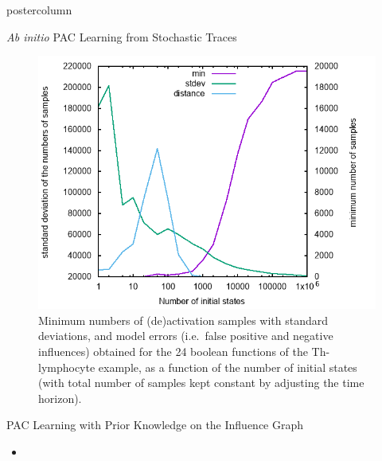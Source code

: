 \documentclass[final,hyperref={pdfpagelabels=false},xcolor=dvipsnames]{beamer}
\begin{document}
\begin{frame}
\begin{columns}
\begin{column}{.49\textwidth}
\begin{beamercolorbox}[center,wd=\textwidth]{postercolumn}
\begin{minipage}[T]{.95\textwidth}
{\begin{block}{\emph{Ab initio} PAC Learning from Stochastic Traces}
\begin{figure}[htb]
   \includegraphics[width=\textwidth]{statistics/statistics.png}
   \caption{Minimum numbers of (de)activation samples with standard deviations, and model errors (i.e.~false positive and negative influences) obtained for the 24 boolean functions of the Th-lymphocyte example, as a function of the number of initial states 
(with total number of samples kept constant by adjusting the time horizon).}
\label{fig:statistics}
\end{figure}

            \end{block}
            \vfill
	    \begin{block}{PAC Learning with Prior Knowledge on the Influence Graph}
              \begin{itemize}
              \item 
              \end{itemize}
              

\end{block}}
\end{minipage}
\end{beamercolorbox}
\end{column}
\end{columns}
\end{frame}
\end{document}
